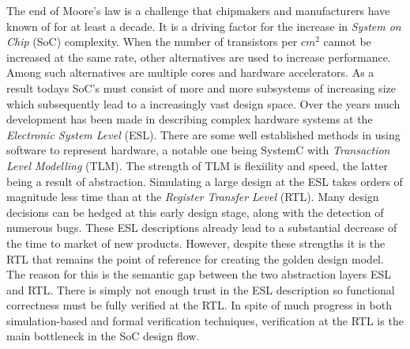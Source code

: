 
The end of Moore's law is a challenge that chipmakers and manufacturers have known of for at least a decade. It is a driving factor for the increase in \textit{System on Chip} (SoC) complexity. When the number of transistors per $cm^2$ cannot be increased at the same rate, other alternatives are used to increase performance. Among such alternatives are multiple cores and hardware accelerators. As a result todays SoC's must consist of more and more subsystems of increasing size which subsequently lead to a increasingly vast design space. Over the years much development has been made in describing complex hardware systems at the \textit{Electronic System Level} (ESL). There are some well established methods in using software to represent hardware, a notable one being SystemC with \textit{Transaction Level Modelling} (TLM). The strength of TLM is flexiility and speed, the latter being a result of abstraction. Simulating a large design at the ESL takes orders of magnitude less time than at the \textit{Register Transfer Level} (RTL). Many design decisions can be hedged at this early design stage, along with the detection of numerous bugs. These ESL descriptions already lead to a substantial decrease of the time to market of new products. However, despite these strengths it is the RTL that remains the point of reference for creating the golden design model. The reason for this is the semantic gap between the two abstraction layers ESL and RTL. There is simply not enough trust in the ESL description so functional correctness must be fully verified at the RTL. In spite of much progress in both simulation-based and formal verification techniques, verification at the RTL is the main bottleneck in the SoC design flow. \\
\newline
